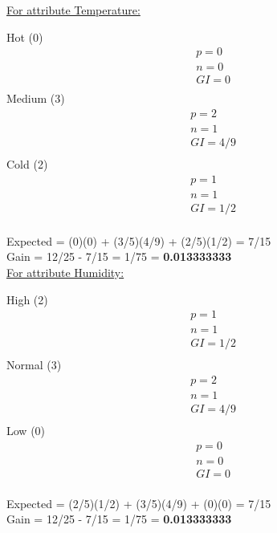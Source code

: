 \documentclass[8pt, fullpage,letterpaper]{article}
\begin{document}
\begin{enumerate}
\begin{enumerate}
\begin{enumerate}
\begin{enumerate}
\begin{itemize}
						\underline {For attribute Temperature:} 
							\vspace{-5pt}
							\begin{multicols}{3}
								Hot (0)
			 						\begin{align*}
									    	& p = 0\\
										& n = 0 \\
									    	& GI = 0\\
								      \end{align*}
								Medium (3)
			 						\begin{align*}
									    	& p = 2\\
										& n = 1 \\
									    	& GI = 4/9\\
								      \end{align*}
								Cold (2)
			 						\begin{align*}
									    	& p = 1\\
										& n = 1 \\
									    	& GI = 1/2\\
								      \end{align*}
							\end{multicols}
							\vspace{-20pt}
							Expected = (0)(0) + (3/5)(4/9) + (2/5)(1/2) = 7/15\\
							Gain = 12/25 - 7/15 = 1/75 = {\bf 0.013333333}\\

						\underline {For attribute Humidity:} 
							\vspace{-5pt}
							\begin{multicols}{3}
								High (2)
			 						\begin{align*}
									    	& p = 1\\
										& n = 1 \\
									    	& GI = 1/2\\
								      \end{align*}
								Normal (3)
			 						\begin{align*}
									    	& p = 2\\
										& n = 1 \\
									    	& GI = 4/9\\
								      \end{align*}
								Low (0)
			 						\begin{align*}
									    	& p = 0\\
										& n = 0 \\
									    	& GI = 0\\
								      \end{align*}
							\end{multicols}
							\vspace{-20pt}
							Expected = (2/5)(1/2) + (3/5)(4/9) + (0)(0) = 7/15\\
							Gain = 12/25 - 7/15 = 1/75 = {\bf 0.013333333}\\


\end{itemize}
\end{enumerate}
\end{enumerate}
\end{enumerate}
\end{enumerate}
\end{document}
